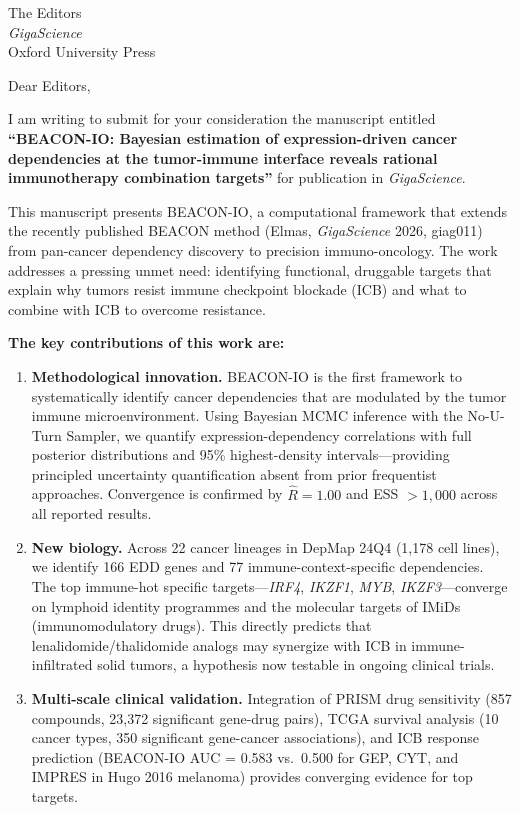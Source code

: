 \documentclass[12pt]{letter}
\date{\today}
\begin{document}
\begin{letter}{
  The Editors\\
  \textit{GigaScience}\\
  Oxford University Press
}

\opening{Dear Editors,}

I am writing to submit for your consideration the manuscript entitled \textbf{``BEACON-IO: Bayesian estimation of expression-driven cancer dependencies at the tumor-immune interface reveals rational immunotherapy combination targets''} for publication in \textit{GigaScience}.

This manuscript presents BEACON-IO, a computational framework that extends the recently published BEACON method (Elmas, \textit{GigaScience} 2026, giag011) from pan-cancer dependency discovery to precision immuno-oncology. The work addresses a pressing unmet need: identifying functional, druggable targets that explain why tumors resist immune checkpoint blockade (ICB) and what to combine with ICB to overcome resistance.

\textbf{The key contributions of this work are:}

\begin{enumerate}
  \item \textbf{Methodological innovation.} BEACON-IO is the first framework to systematically identify cancer dependencies that are modulated by the tumor immune microenvironment. Using Bayesian MCMC inference with the No-U-Turn Sampler, we quantify expression-dependency correlations with full posterior distributions and 95\% highest-density intervals---providing principled uncertainty quantification absent from prior frequentist approaches. Convergence is confirmed by $\hat{R} = 1.00$ and ESS $> 1{,}000$ across all reported results.

  \item \textbf{New biology.} Across 22 cancer lineages in DepMap 24Q4 (1,178 cell lines), we identify 166 EDD genes and 77 immune-context-specific dependencies. The top immune-hot specific targets---\textit{IRF4}, \textit{IKZF1}, \textit{MYB}, \textit{IKZF3}---converge on lymphoid identity programmes and the molecular targets of IMiDs (immunomodulatory drugs). This directly predicts that lenalidomide/thalidomide analogs may synergize with ICB in immune-infiltrated solid tumors, a hypothesis now testable in ongoing clinical trials.

  \item \textbf{Multi-scale clinical validation.} Integration of PRISM drug sensitivity (857 compounds, 23,372 significant gene-drug pairs), TCGA survival analysis (10 cancer types, 350 significant gene-cancer associations), and ICB response prediction (BEACON-IO AUC = 0.583 vs.\ 0.500 for GEP, CYT, and IMPRES in Hugo 2016 melanoma) provides converging evidence for top targets.


\end{enumerate}
\end{letter}
\end{document}

